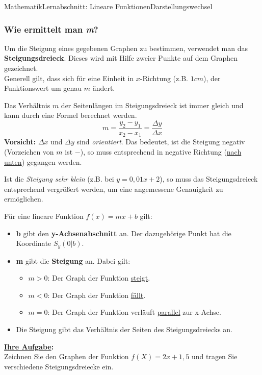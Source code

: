 \documentclass[11pt,twocolumn,oneside,openany,headings=optiontotoc,11pt,numbers=noenddot]{article}
\begin{document}
\begin{worksheet}{Mathematik}{Lernabschnitt: Lineare Funktionen}{Darstellungswechsel}
		\subsubsection*{Wie ermittelt man \textit{m}?}
		Um die Steigung eines gegebenen Graphen zu bestimmen, verwendet man das \textbf{Steigungsdreieck}. Dieses wird mit Hilfe zweier Punkte auf dem Graphen gezeichnet.\\
		Generell gilt, dass sich für eine Einheit in \(x\)-Richtung (z.B. \(1cm\)), der Funktionswert um genau \(m\) ändert.\\
		\par\noindent
		Das Verhältnis \(m\) der Seitenlängen im Steigungsdreieck ist immer gleich und kann durch eine Formel berechnet werden.
		\[m = \frac{y_2-y_1}{x_2-x_1} = \frac{\Delta{}y}{\Delta{}x}\]
		\textbf{Vorsicht:} \(\Delta{}x\) und \(\Delta{}y\) sind \textit{orientiert}. Das bedeutet, ist die Steigung negativ (Vorzeichen von \(m\) ist \(-\)), so muss entsprechend in negative Richtung (\underline{nach unten}) gegangen werden.\\
		\par\noindent
		Ist die \textit{Steigung sehr klein} (z.B. bei \(y = 0,01x + 2\)), so muss das Steigungsdreieck entsprechend vergrößert werden, um eine angemessene Genauigkeit zu ermöglichen.
		\begin{framed}
			\noindent
			Für eine lineare Funktion \(f(x) = mx+b\) gilt:
			\begin{itemize}
				\item \textbf{b} gibt den \textbf{y-Achsenabschnitt} an. Der dazugehörige Punkt hat die Koordinate \(S_y(0|b)\).
				\item \textbf{m} gibt die \textbf{Steigung} an. Dabei gilt:
				\begin{itemize}
					\item \(m>0\): Der Graph der Funktion \underline{steigt}.
					\item \(m<0\): Der Graph der Funktion \underline{fällt}.
					\item \(m=0\): Der Graph der Funktion verläuft \underline{parallel} zur x-Achse.
				\end{itemize}
				\item Die Steigung gibt das Verhältnis der Seiten des Steigungsdreiecks an.
			\end{itemize}
		\end{framed}
		\noindent
		\textbf{\underline{Ihre Aufgabe}:}\\
		Zeichnen Sie den Graphen der Funktion \(f(X) = 2x + 1,5\) und tragen Sie verschiedene Steigungsdreiecke ein.

\end{worksheet}
\end{document}

